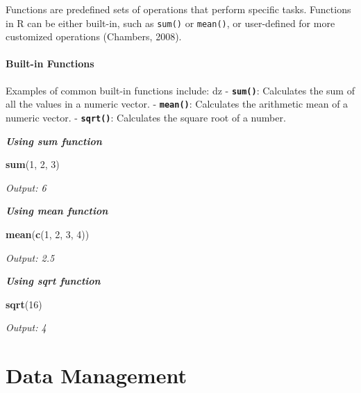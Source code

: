 \documentclass[
]{book}
\newenvironment{Shaded}{\begin{snugshade}}{\end{snugshade}}
\newcommand{\DecValTok}[1]{\textcolor[rgb]{0.00,0.00,0.81}{#1}}
\newcommand{\FunctionTok}[1]{\textcolor[rgb]{0.13,0.29,0.53}{\textbf{#1}}}
\newcommand{\NormalTok}[1]{#1}
\begin{document}
Functions are predefined sets of operations that perform specific tasks. Functions in R can be either built-in, such as \texttt{sum()} or \texttt{mean()}, or user-defined for more customized operations (Chambers, 2008).

\subsubsection*{Built-in Functions}\label{built-in-functions}

Examples of common built-in functions include: dz - \textbf{\texttt{sum()}}: Calculates the sum of all the values in a numeric vector. - \textbf{\texttt{mean()}}: Calculates the arithmetic mean of a numeric vector. - \textbf{\texttt{sqrt()}}: Calculates the square root of a number.

\textbf{\emph{Using sum function}}

\begin{Shaded}
\begin{Highlighting}[]
\FunctionTok{sum}\NormalTok{(}\DecValTok{1}\NormalTok{, }\DecValTok{2}\NormalTok{, }\DecValTok{3}\NormalTok{)}
\end{Highlighting}
\end{Shaded}

\emph{Output: 6}

\textbf{\emph{Using mean function}}

\begin{Shaded}
\begin{Highlighting}[]
\FunctionTok{mean}\NormalTok{(}\FunctionTok{c}\NormalTok{(}\DecValTok{1}\NormalTok{, }\DecValTok{2}\NormalTok{, }\DecValTok{3}\NormalTok{, }\DecValTok{4}\NormalTok{))}
\end{Highlighting}
\end{Shaded}

\emph{Output: 2.5}

\textbf{\emph{Using sqrt function}}

\begin{Shaded}
\begin{Highlighting}[]
\FunctionTok{sqrt}\NormalTok{(}\DecValTok{16}\NormalTok{)}
\end{Highlighting}
\end{Shaded}

\emph{Output: 4}

\chapter{Data Management}\label{data-management}
\end{document}
